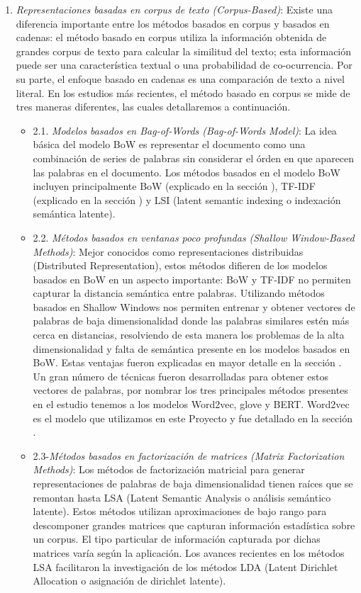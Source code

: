 \documentclass[12pt,a4paper]{article}
\begin{document}
\begin{sloppypar}
\begin{enumerate}
\item \textit{Representaciones basadas en corpus de texto (Corpus-Based)}: Existe una diferencia importante entre los métodos basados en corpus y basados en cadenas: el método basado en corpus utiliza la información obtenida de grandes corpus de texto para calcular la similitud del texto; esta información puede ser una característica textual o una probabilidad de co-ocurrencia. Por su parte, el enfoque basado en cadenas es una comparación de texto a nivel literal. En los estudios más recientes, el método basado en corpus se mide de tres maneras diferentes, las cuales detallaremos a continuación. 

\begin{itemize}
\item 2.1. \textit{Modelos basados en Bag-of-Words (Bag-of-Words Model)}: La idea básica del modelo BoW es representar el documento como una combinación de series de palabras sin considerar el órden en que aparecen las palabras en el documento. Los métodos basados en el modelo BoW incluyen principalmente BoW (explicado en la sección \textit{}), TF-IDF (explicado en la sección \textit{}) y LSI (latent semantic indexing o indexación semántica latente).

\item 2.2. \textit{Métodos basados en ventanas poco profundas (Shallow Window-Based Methods)}: Mejor conocidos como representaciones distribuidas (Distributed Representation), estos métodos difieren de los modelos basados en BoW en un aspecto importante: BoW y TF-IDF no permiten capturar la distancia semántica entre palabras. Utilizando métodos basados en Shallow Windows nos permiten entrenar y obtener vectores de palabras de baja dimensionalidad donde las palabras similares estén más cerca en distancias, resolviendo de esta manera los problemas de la alta dimensionalidad y falta de semántica presente en los modelos basados en BoW. Estas ventajas fueron explicadas en mayor detalle en la sección \textit{}. Un gran número de técnicas fueron desarrolladas para obtener estos vectores de palabras, por nombrar los tres principales métodos presentes en el estudio tenemos a los modelos Word2vec, glove y BERT. Word2vec es el modelo que utilizamos en este Proyecto y fue detallado en la sección \textit{}.

\item 2.3-\textit{Métodos basados en factorización de matrices (Matrix Factorization Methods)}: Los métodos de factorización matricial para generar representaciones de palabras de baja dimensionalidad tienen raíces que se remontan hasta LSA (Latent Semantic Analysis o análisis semántico latente). Estos métodos utilizan aproximaciones de bajo rango para descomponer grandes matrices que capturan información estadística sobre un corpus. El tipo particular de información capturada por dichas matrices varía según la aplicación. Los avances recientes en los métodos LSA facilitaron la investigación de los métodos LDA (Latent Dirichlet Allocation o asignación de dirichlet latente).
\end{itemize}


\end{enumerate}
\end{sloppypar}
\end{document}
